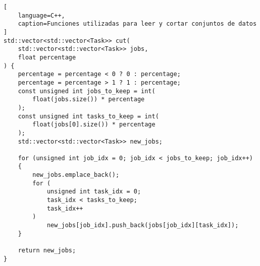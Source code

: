 \begin{lstlisting}[
    language=C++,
    caption=Funciones utilizadas para leer y cortar conjuntos de datos
]
std::vector<std::vector<Task>> cut(
    std::vector<std::vector<Task>> jobs,
    float percentage
) {
    percentage = percentage < 0 ? 0 : percentage;
    percentage = percentage > 1 ? 1 : percentage;
    const unsigned int jobs_to_keep = int(
        float(jobs.size()) * percentage
    );
    const unsigned int tasks_to_keep = int(
        float(jobs[0].size()) * percentage
    );
    std::vector<std::vector<Task>> new_jobs;

    for (unsigned int job_idx = 0; job_idx < jobs_to_keep; job_idx++)
    {
        new_jobs.emplace_back();
        for (
            unsigned int task_idx = 0;
            task_idx < tasks_to_keep;
            task_idx++
        )
            new_jobs[job_idx].push_back(jobs[job_idx][task_idx]);
    }

    return new_jobs;
}
\end{lstlisting}

\pagebreak
